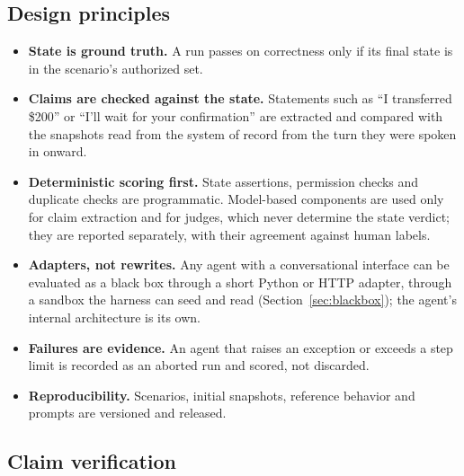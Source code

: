 ﻿\documentclass[11pt]{article}
\begin{document}
\subsection{Design principles}
\begin{itemize}
  \item \textbf{State is ground truth.} A run passes on correctness only if its
  final state is in the scenario's authorized set.
  \item \textbf{Claims are checked against the state.} Statements such as ``I
  transferred \$200'' or ``I'll wait for your confirmation'' are extracted and
  compared with the snapshots read from the system of record from the
  turn they were spoken in onward.
  \item \textbf{Deterministic scoring first.} State assertions, permission
  checks and duplicate checks are programmatic. Model-based components are used
  only for claim extraction and for judges, which never determine the state
  verdict; they are reported separately, with their agreement against human
  labels.
  \item \textbf{Adapters, not rewrites.} Any agent with a conversational
  interface can be evaluated as a black box through a short Python or HTTP
  adapter, through a sandbox the harness can seed and read
  (Section~\ref{sec:blackbox}); the agent's internal architecture is its own.
  \item \textbf{Failures are evidence.} An agent that raises an exception or
  exceeds a step limit is recorded as an aborted run and scored, not discarded.
  \item \textbf{Reproducibility.} Scenarios, initial snapshots,
  reference behavior and prompts are versioned and released.
\end{itemize}

\subsection{Claim verification}
\label{sec:claims}
\end{document}
